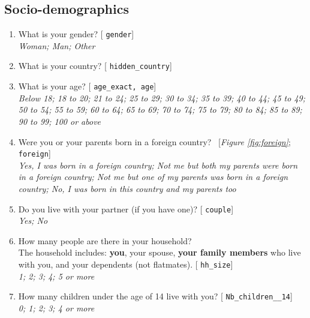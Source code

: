 \documentclass[12pt,english]{article}
\begin{document}
\begin{bibunit}
 \subsection*{Socio-demographics} 
 \begin{enumerate}[resume] 
\item  \label{q:gender} What is your gender? [%
\verb|gender|]
  \\ \textit{Woman; Man; Other}

\item  \label{q:hidden_country} What is your country? [%
\verb|hidden_country|]


\item  \label{q:age_exact} What is your age? [%
\verb|age_exact, age|]
  \\ \textit{Below 18; 18 to 20; 21 to 24; 25 to 29; 30 to 34; 35 to 39; 40 to 44; 45 to 49; 50 to 54; 55 to 59; 60 to 64; 65 to 69; 70 to 74; 75 to 79; 80 to 84; 85 to 89; 90 to 99; 100 or above}

\item  \label{q:foreign} Were you or your parents born in a foreign country?~ [\textit{Figure \ref{fig:foreign}}; 
\verb|foreign|]
  \\ \textit{Yes, I was born in a foreign country; Not me but both my parents were born in a foreign country; Not me but one of my parents was born in a foreign country; No, I was born in this country and my parents too}

\item  \label{q:couple} Do you live with your partner (if you have one)? [%
\verb|couple|]
  \\ \textit{Yes; No}

\item  \label{q:hh_size} How many people are there in your household? \\The household includes: \textbf{you}, your spouse, \textbf{your family members} who live with you, and your dependents (not flatmates). [%
\verb|hh_size|]
  \\ \textit{1; 2; 3; 4; 5 or more}

\item  \label{q:Nb_children__14} How many children under the age of 14 live with you? [%
\verb|Nb_children__14|]
  \\ \textit{0; 1; 2; 3; 4 or more}


\end{enumerate}
\end{bibunit}
\end{document}
